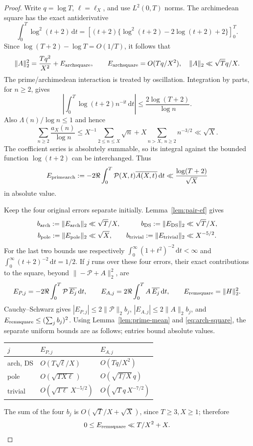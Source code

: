 \documentclass[11pt]{article}
\newcommand{\dd}{\,\mathrm d}
\newcommand{\ii}{\mathrm i}
\newcommand{\PS}{\mathcal P}
\newcommand{\EP}{E_{\mathrm{pole}}}
\newcommand{\ET}{E_{\mathrm{trivial}}}
\newcommand{\EA}{E_{\mathrm{arch}}}
\newcommand{\ED}{E_{\mathrm{DS}}}
\begin{document}
\begin{proof}
Write \(q=\log T\), \(\ell=\ell_X\), and use \(L^2(0,T)\) norms.
The archimedean square has the exact antiderivative
\[
 \int_0^T\log^2(t+2)\dd t
 =\left[(t+2)\{\log^2(t+2)-2\log(t+2)+2\}\right]_0^T.
\]
Since \(\log(T+2)-\log T=O(1/T)\), it follows that
\begin{equation}\label{eq:arch-square}
 \|A\|_2^2=\frac{Tq^2}{X^2}+E_{\rm archsquare},\qquad
 E_{\rm archsquare}=O(Tq/X^2),\quad
 \|A\|_2\ll\sqrt Tq/X.
\end{equation}
The prime/archimedean interaction is treated by oscillation.
Integration by parts, for \(n\geq2\), gives
\[
 \left|\int_0^T\log(t+2)n^{-\ii t}\dd t\right|
 \leq\frac{2\log(T+2)}{\log n}.
\]
Also \(\Lambda(n)/\log n\leq1\) and hence
\[
 \sum_{n\geq2}\frac{a_X(n)}{\log n}
 \leq X^{-1}\sum_{2\leq n\leq X}\sqrt n
        +X\sum_{n>X,\ n\geq2}n^{-3/2}\ll\sqrt X.
\]
The coefficient series is absolutely summable, so its integral
against the bounded function \(\log(t+2)\) can be interchanged.
Thus
\begin{equation}\label{eq:prime-arch-cross}
 E_{\rm primearch}:=-2\Re\int_0^T\PS(X,t)\overline{A(X,t)}\dd t
 \ll\frac{\log(T+2)}{\sqrt X}
\end{equation}
in absolute value.

Keep the four original errors separate initially. Lemma~\ref{lem:pair-ef}
gives
\begin{align*}
 b_{\rm arch}:=\|\EA\|_2&\ll\sqrt T/X,&
 b_{\rm DS}:=\|\ED\|_2&\ll\sqrt T/X,\\
 b_{\rm pole}:=\|\EP\|_2&\ll\sqrt X,&
 b_{\rm trivial}:=\|\ET\|_2&\ll X^{-5/2}.
\end{align*}
For the last two bounds use respectively
\(\int_0^\infty(1+t^2)^{-2}\dd t<\infty\) and
\(\int_0^\infty(t+2)^{-2}\dd t=1/2\).
If \(j\) runs over these four errors, their exact contributions
to the square, beyond \(\|-\PS+A\|_2^2\), are
\[
 E_{P,j}=-2\Re\int_0^T\PS\,\overline{E_j}\dd t,\qquad
 E_{A,j}=2\Re\int_0^T A\,\overline{E_j}\dd t,\qquad
 E_{\rm remsquare}=\|H\|_2^2.
\]
Cauchy--Schwarz gives
\(|E_{P,j}|\leq2\|\PS\|_2b_j\),
\(|E_{A,j}|\leq2\|A\|_2b_j\), and
\(E_{\rm remsquare}\leq(\sum_jb_j)^2\).
Using Lemma~\ref{lem:prime-mean} and \eqref{eq:arch-square},
the separate uniform bounds are as follows; entries bound absolute values.
\begin{center}
\begin{tabular}{lll}
\toprule
\(j\) & \(E_{P,j}\) & \(E_{A,j}\)\\
\midrule
arch, DS & \(O(T\sqrt\ell/X)\) & \(O(Tq/X^2)\)\\
pole & \(O(\sqrt{TX\ell})\) & \(O(\sqrt{T/X}\,q)\)\\
trivial & \(O(\sqrt{T\ell}\,X^{-5/2})\)
        & \(O(\sqrt Tq\,X^{-7/2})\)\\
\bottomrule
\end{tabular}
\end{center}
The sum of the four \(b_j\) is \(O(\sqrt T/X+\sqrt X)\), since
\(T\geq3,X\geq1\); therefore
\[
 0\leq E_{\rm remsquare}\ll T/X^2+X.
\]


\end{proof}
\end{document}
